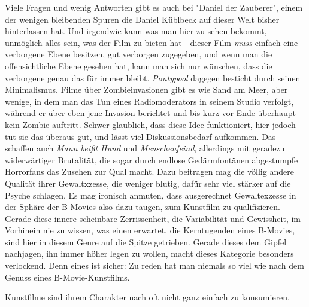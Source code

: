 Viele Fragen und wenig Antworten gibt es auch bei "Daniel der Zauberer", einem
der wenigen bleibenden Spuren die Daniel Küblbeck auf dieser Welt bisher
hinterlassen hat. 
Und irgendwie kann was man hier zu sehen bekommt, unmöglich alles sein, was der
Film zu bieten hat - dieser Film \emph{muss} einfach eine verborgene Ebene
besitzen, gut verborgen zugegeben, und wenn man die offensichtliche Ebene
gesehen hat, kann man sich nur wünschen, dass die verborgene genau das für immer bleibt.
\emph{Pontypool} dagegen besticht durch seinen Minimalismus. 
Filme über Zombieinvasionen gibt es wie Sand am Meer, aber wenige, in dem
man das Tun eines Radiomoderators in seinem Studio verfolgt, während er über
eben jene Invasion berichtet und bis kurz vor Ende überhaupt kein Zombie auftritt.
Schwer glaublich, dass diese Idee funktioniert, hier jedoch tut sie das überaus
gut, und lässt viel Diskussionsbedarf aufkommen.
Das schaffen auch \emph{Mann beißt Hund} und \emph{Menschenfeind}, allerdings mit geradezu 
widerwärtiger Brutalität, die sogar durch endlose Gedärmfontänen abgestumpfe
Horrorfans das Zusehen zur Qual macht. 
Dazu beitragen mag die völlig andere Qualität ihrer Gewaltxzesse, die weniger
blutig, dafür sehr viel stärker auf die Psyche schlagen.
Es mag ironisch anmuten, dass ausgerechnet Gewaltexzesse in der Sphäre der
B-Movies also dazu taugen, zum Kunstfilm zu qualifizieren.
Gerade diese innere scheinbare Zerrissenheit, die Variabilität und Gewissheit,
im Vorhinein nie zu wissen, was einen erwartet, die Kerntugenden eines B-Movies, 
sind hier in diesem Genre auf die Spitze getrieben.
Gerade dieses dem Gipfel nachjagen, ihn immer höher legen zu wollen, macht
dieses Kategorie besonders verlockend.
Denn eines ist sicher: Zu reden hat man niemals so viel wie nach dem Genuss
eines B-Movie-Kunstfilms.
 

Kunstfilme sind ihrem Charakter nach oft nicht ganz einfach zu konsumieren.



